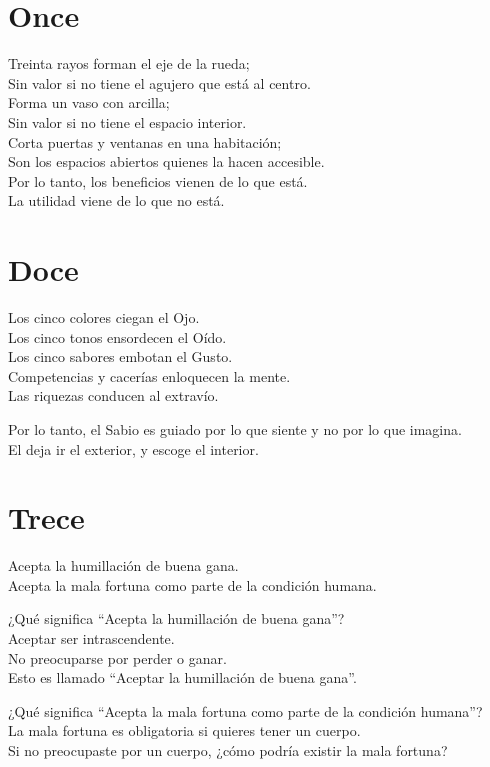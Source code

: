 \documentclass[book,b5paper,hidelinks,final]{memoir}
\begin{document}
	\chapter*{Once}
	
	Treinta rayos forman el eje de la rueda;\\
	Sin valor si no tiene el agujero que está al centro.\\
	Forma un vaso con arcilla;\\
	Sin valor si no tiene el espacio interior.\\
	Corta puertas y ventanas en una habitación;\\
	Son los espacios abiertos quienes la hacen accesible.\\
	Por lo tanto, los beneficios vienen de lo que está.\\
	La utilidad viene de lo que no está.
	
	\chapter*{Doce}
	
	Los cinco colores ciegan el Ojo.\\
	Los cinco tonos ensordecen el Oído.\\
	Los cinco sabores embotan el Gusto.\\
	Competencias y cacerías enloquecen la mente.\\
	Las riquezas conducen al extravío.
	
	Por lo tanto, el Sabio es guiado por lo que siente y no por lo que
	imagina.\\
	El deja ir el exterior, y escoge el interior.
	
	\chapter*{Trece}
	
	Acepta la humillación de buena gana.\\
	Acepta la mala fortuna como parte de la condición humana.
	
	¿Qué significa ``Acepta la humillación de buena gana''?\\
	Aceptar ser intrascendente.\\
	No preocuparse por perder o ganar.\\
	Esto es llamado ``Aceptar la humillación de buena gana''.
	
	¿Qué significa ``Acepta la mala fortuna como parte de la condición
	humana''?\\
	La mala fortuna es obligatoria si quieres tener un cuerpo.\\
	Si no preocupaste por un cuerpo, ¿cómo podría existir la mala fortuna?
	
\end{document}
